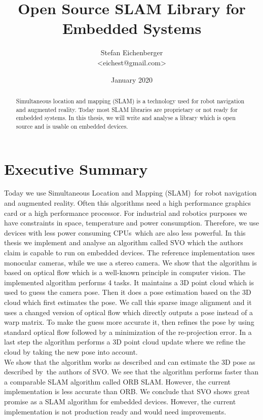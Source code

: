 \documentclass[11pt,a4paper,titlepage,oneside]{report}
\title{Open Source SLAM Library for Embedded Systems}
\author{Stefan Eichenberger\\<eichest@gmail.com>}
\date{January 2020}
\begin{document}
\maketitle
\begin{abstract}
	Simultaneous location and mapping (SLAM) is a technology used for robot navigation and augmented reality. Today most SLAM libraries are proprietary or not ready for embedded systems. In this thesis, we will write and analyse a library which is open source and is usable on embedded devices.
\end{abstract}

\section*{Executive Summary}
Today we use Simultaneous Location and Mapping (SLAM) for robot navigation and augmented reality. Often this algorithms need a high performance graphics card or a high performance processor. For industrial and robotics purposes we have constraints in space, temperature and power consumption. Therefore, we use devices with less power consuming CPUs which are also less powerful. In this thesis we implement and analyse an algorithm called SVO which the authors claim is capable to run on embedded devices. The reference implementation uses monocular cameras, while we use a stereo camera. We show that the algorithm is based on optical flow which is a well-known principle in computer vision. The implemented algorithm performs 4 tasks. It maintains a 3D point cloud which is used to guess the camera pose. Then it does a pose estimation based on the 3D cloud which first estimates the pose. We call this sparse image alignment and it uses a changed version of optical flow which directly outputs a pose instead of a warp matrix. To make the guess more accurate it, then refines the pose by using standard optical flow followed by a minimization of the re-projection error. In a last step the algorithm performs a 3D point cloud update where we refine the cloud by taking the new pose into account.\\
We show that the algorithm works as described and can estimate the 3D pose as described by the authors of SVO. We see that the algorithm performs faster than a comparable SLAM algorithm called ORB SLAM. However, the current implementation is less accurate than ORB. We conclude that SVO shows great promise as a SLAM algorithm for embedded devices. However, the current implementation is not production ready and would need improvements.
\end{document}
